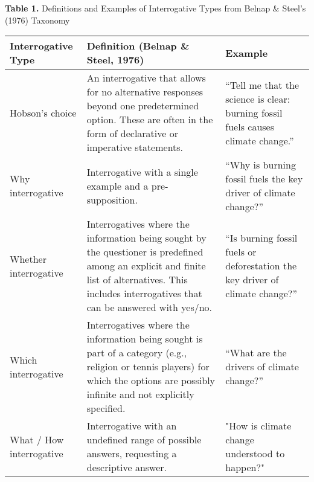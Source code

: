 \documentclass{article}
\begin{document}
\hspace*{0.5cm}\textbf{Table 1.} Definitions and Examples of Interrogative Types from Belnap & Steel’s (1976) Taxonomy

\vspace{2em}

\noindent\begin{minipage}{\textwidth}
\fontsize{10}{12}\selectfont  %

\renewcommand{\arraystretch}{1.2}
\begin{tabular}{p{3cm} p{9cm} p{5.5cm}}
\toprule
\textbf{Interrogative Type} & \textbf{Definition (Belnap \& Steel, 1976)} & \textbf{Example} \\
\midrule
Hobson’s choice & An interrogative that allows for no alternative responses beyond one predetermined option. These are often in the form of declarative or imperative statements. & “Tell me that the science is clear: burning fossil fuels causes climate change.” \\
\addlinespace[0.7em]
Why interrogative & Interrogative with a single example and a pre-supposition. & “Why is burning fossil fuels the key driver of climate change?” \\
\addlinespace[0.7em]
Whether interrogative & Interrogatives where the information being sought by the questioner is predefined among an explicit and finite list of alternatives. This includes interrogatives that can be answered with yes/no. & “Is burning fossil fuels or deforestation the key driver of climate change?” \\
\addlinespace[0.7em]
Which interrogative & Interrogatives where the information being sought is part of a category (e.g., religion or tennis players) for which the options are possibly infinite and not explicitly specified. & “What are the drivers of climate change?” \\
\addlinespace[0.7em]
What / How interrogative & Interrogative with an undefined range of possible answers, requesting a descriptive answer. & "How is climate change understood to happen?" \\
\bottomrule
\end{tabular}
\end{minipage}
\end{document}
